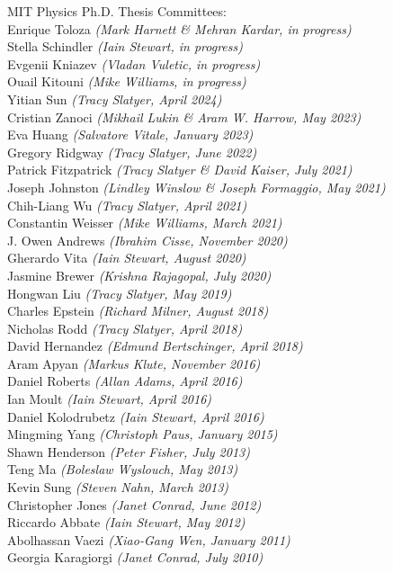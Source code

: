 \bbl

\item MIT Physics Ph.D. Thesis Committees:
\\ Enrique Toloza \textit{(Mark Harnett \& Mehran Kardar, in progress)}
\\ Stella Schindler \textit{(Iain Stewart, in progress)}
\\ Evgenii Kniazev \textit{(Vladan Vuletic, in progress)}
\\ Ouail Kitouni \textit{(Mike Williams, in progress)}
\\ Yitian Sun \textit{(Tracy Slatyer, April 2024)}
\\ Cristian Zanoci \textit{(Mikhail Lukin \& Aram W. Harrow, May 2023)}
\\ Eva Huang \textit{(Salvatore Vitale, January 2023)}
\\ Gregory Ridgway \textit{(Tracy Slatyer, June 2022)}
\\ Patrick Fitzpatrick \textit{(Tracy Slatyer \& David Kaiser, July 2021)}
\\ Joseph Johnston \textit{(Lindley Winslow \& Joseph Formaggio, May 2021)}
\\ Chih-Liang Wu \textit{(Tracy Slatyer, April 2021)}
\\ Constantin Weisser \textit{(Mike Williams, March 2021)}
\\ J. Owen Andrews \textit{(Ibrahim Cisse, November 2020)}
\\ Gherardo Vita \textit{(Iain Stewart, August 2020)}
\\ Jasmine Brewer \textit{(Krishna Rajagopal, July 2020)}
\\ Hongwan Liu \textit{(Tracy Slatyer, May 2019)}
\\ Charles Epstein \textit{(Richard Milner, August 2018)}
\\ Nicholas Rodd \textit{(Tracy Slatyer, April 2018)}
\\ David Hernandez \textit{(Edmund Bertschinger, April 2018)}
\\ Aram Apyan \textit{(Markus Klute, November 2016)}
\\ Daniel Roberts \textit{(Allan Adams, April 2016)}
\\ Ian Moult \textit{(Iain Stewart, April 2016)}
\\ Daniel Kolodrubetz \textit{(Iain Stewart, April 2016)}
\\ Mingming Yang \textit{(Christoph Paus, January 2015)}
\\ Shawn Henderson \textit{(Peter Fisher, July 2013)}
\\ Teng Ma \textit{(Boleslaw Wyslouch, May 2013)}
\\ Kevin Sung \textit{(Steven Nahn, March 2013)}
\\ Christopher Jones \textit{(Janet Conrad, June 2012)}
\\ Riccardo Abbate \textit{(Iain Stewart, May 2012)}
\\ Abolhassan Vaezi \textit{(Xiao-Gang Wen, January 2011)}
\\ Georgia Karagiorgi \textit{(Janet Conrad, July 2010)}

